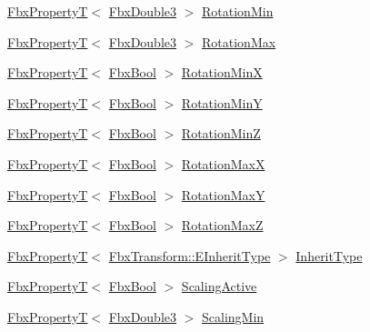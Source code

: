 \begin{Indent}
\begin{DoxyCompactItemize}
\hyperlink{class_fbx_property_t}{Fbx\+PropertyT}$<$ \hyperlink{fbxtypes_8h_ae0a96f14cde566774c7553aa7523b7a7}{Fbx\+Double3} $>$ \hyperlink{class_fbx_node_a186dc96c347a68ff32eb1641f02c70c8}{Rotation\+Min}
\item 
\hyperlink{class_fbx_property_t}{Fbx\+PropertyT}$<$ \hyperlink{fbxtypes_8h_ae0a96f14cde566774c7553aa7523b7a7}{Fbx\+Double3} $>$ \hyperlink{class_fbx_node_a04c8e5651641fbfafaa2adb18be50696}{Rotation\+Max}
\item 
\hyperlink{class_fbx_property_t}{Fbx\+PropertyT}$<$ \hyperlink{fbxtypes_8h_a92e0562b2fe33e76a242f498b362262e}{Fbx\+Bool} $>$ \hyperlink{class_fbx_node_a8b07f4e0bae14c76b79405c0f881a492}{Rotation\+MinX}
\item 
\hyperlink{class_fbx_property_t}{Fbx\+PropertyT}$<$ \hyperlink{fbxtypes_8h_a92e0562b2fe33e76a242f498b362262e}{Fbx\+Bool} $>$ \hyperlink{class_fbx_node_aa1e032cbdaad4bac9ef9dbc6efe3fcea}{Rotation\+MinY}
\item 
\hyperlink{class_fbx_property_t}{Fbx\+PropertyT}$<$ \hyperlink{fbxtypes_8h_a92e0562b2fe33e76a242f498b362262e}{Fbx\+Bool} $>$ \hyperlink{class_fbx_node_ab78b8c903c7104974ff2567dbc43f3cf}{Rotation\+MinZ}
\item 
\hyperlink{class_fbx_property_t}{Fbx\+PropertyT}$<$ \hyperlink{fbxtypes_8h_a92e0562b2fe33e76a242f498b362262e}{Fbx\+Bool} $>$ \hyperlink{class_fbx_node_a727d3f12af78c3ae37e77b5d87c97f79}{Rotation\+MaxX}
\item 
\hyperlink{class_fbx_property_t}{Fbx\+PropertyT}$<$ \hyperlink{fbxtypes_8h_a92e0562b2fe33e76a242f498b362262e}{Fbx\+Bool} $>$ \hyperlink{class_fbx_node_a4182202837129c1e05f5dba5b37cb8c6}{Rotation\+MaxY}
\item 
\hyperlink{class_fbx_property_t}{Fbx\+PropertyT}$<$ \hyperlink{fbxtypes_8h_a92e0562b2fe33e76a242f498b362262e}{Fbx\+Bool} $>$ \hyperlink{class_fbx_node_a6d1242899fb510f5d5df4f3a1a7cf32c}{Rotation\+MaxZ}
\item 
\hyperlink{class_fbx_property_t}{Fbx\+PropertyT}$<$ \hyperlink{class_fbx_transform_ac1ab8f75b4873723daa68c57f999b10f}{Fbx\+Transform\+::\+E\+Inherit\+Type} $>$ \hyperlink{class_fbx_node_a649fc6e97217d0105e65b712d2b0053f}{Inherit\+Type}
\item 
\hyperlink{class_fbx_property_t}{Fbx\+PropertyT}$<$ \hyperlink{fbxtypes_8h_a92e0562b2fe33e76a242f498b362262e}{Fbx\+Bool} $>$ \hyperlink{class_fbx_node_a4e49b1c82db99e0b2369e8c9563e5ef7}{Scaling\+Active}
\item 
\hyperlink{class_fbx_property_t}{Fbx\+PropertyT}$<$ \hyperlink{fbxtypes_8h_ae0a96f14cde566774c7553aa7523b7a7}{Fbx\+Double3} $>$ \hyperlink{class_fbx_node_a90124619387dc0d2f078d4301cffb4d9}{Scaling\+Min}

\end{DoxyCompactItemize}
\end{Indent}
